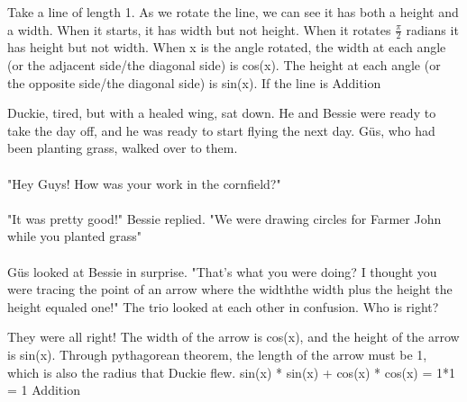  {}
 {Take a line of length 1. As we rotate the line, we can see it has both a height and a width. When it starts, it has width but not height. When it rotates $\frac{\pi}{2}$ radians it has height but not width. When x is the angle rotated, the width at each angle (or the adjacent side/the diagonal side) is cos(x). The height at each angle (or the opposite side/the diagonal side) is sin(x). If the line is}
 {Addition}
 {Duckie, tired, but with a healed wing, sat down. He and Bessie were ready to take the day off, and he was ready to start flying the next day. Güs, who had been planting grass, walked over to them. 
 \paragraph{} "Hey Guys! How was your work in the cornfield?"
 \paragraph{} "It was pretty good!" Bessie replied. "We were drawing circles for Farmer John while you planted grass"
 \paragraph{} Güs looked at Bessie in surprise. "That's what you were doing? I thought you were tracing the point of an arrow where the width\texttimes the width plus the height \texttimes the height equaled one!"
 The trio looked at each other in confusion. Who is right?}
 {They were all right! The width of the arrow is cos(x), and the height of the arrow is sin(x). Through pythagorean theorem, the length of the arrow must be 1, which is also the radius that Duckie flew.}
 {sin(x) * sin(x) + cos(x) * cos(x) = 1*1 = 1}
 {Addition}